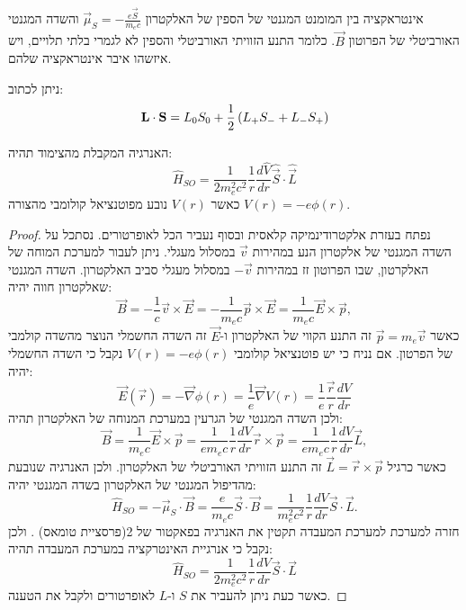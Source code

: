 \documentclass{tstextbook}
\begin{document}
\begin{definition}
אינטראקציה בין המומנט המגנטי של הספין של האלקטרון \(\vec{\mu}_{S}=-\frac{e\vec{S}}{m_{e}c}\) והשדה המגנטי האורביטלי של הפרוטון \(\vec{B}\). כלומר התנע הזוויתי האורביטלי והספין לא לגמרי בלתי תלויים, ויש איזשהו איבר אינטראקציה שלהם.

\end{definition}
\begin{lemma}
ניתן לכתוב:
$${\bf L}\cdot{\bf S}={ L}_{0}S_{0}+\frac{1}{2}\left({ L}_{+}S_{-}+{ L}_{-}S_{+}\right)$$

\end{lemma}
\begin{proposition}
האנרגיה המקבלת מהצימוד תהיה:
$$\hat{H}_{S O}=\frac{1}{2m_{e}^{2}c^{2}}\frac{1}{r}\frac{d\hat{V}}{d r}\hat{\vec{S}}\cdot\hat{\vec{L}}$$
כאשר \(V(r)\) נובע מפוטנציאל קולומבי מהצורה \(V(r)=-e\phi(r)\).

\end{proposition}
\begin{proof}
נפתח בעזרת אלקטרודינמיקה קלאסית ובסוף נעביר הכל לאופרטורים. נסתכל על השדה המגנטי של אלקטרון הנע במהירות \(\vec{v}\) במסלול מעגלי. ניתן לעבור למערכת המוחה של האלקרטון, שבו הפרוטון זז במהירות \(-\vec{v}\) במסלול מעגלי סביב האלקטרון. השדה המגנטי שאלקטרון חווה יהיה:
$$\vec{B}=-\frac{1}{c}\vec{v}\times\vec{E}=-\frac{1}{m_{e}c}\vec{p}\times\vec{E}=\frac{1}{m_{e}c}\vec{E}\times\vec{p},$$
כאשר \(\vec{p}=m_{e}\vec{v}\) זה התנע הקווי של האלקטרון ו-\(\vec{E}\) זה השדה החשמלי הנוצר מהשדה קולמבי של הפרטון. אם נניח כי יש פוטנציאל קולומבי \(V(r)=-e\phi(r)\) נקבל כי השדה החשמלי יהיה:
$$\vec{E}(\vec{r})=-\vec{\nabla}\phi(r)=\frac{1}{e}\vec{\nabla}V(r)=\frac{1}{e}\frac{\vec{r}}{r}\frac{d V}{d r}$$
ולכן השדה המגנטי של הגרעין במערכת המנוחה של האלקטרון תהיה:
$${\vec{B}}={\frac{1}{m_{e}c}}{\vec{E}}\times{\vec{p}}={\frac{1}{e m_{e}c}}{\frac{1}{r}}{\frac{d V}{d r}}{\vec{r}}\times{\vec{p}}={\frac{1}{e m_{e}c}}{\frac{1}{r}}{\frac{d V}{d r}}{\vec{L}},$$
כאשר כרגיל \(\vec{L}=\vec{r}\times \vec{p}\) זה התנע הזוויתי האורביטלי של האלקטרון. ולכן האנרגיה שנובעת מהדיפול המגנטי של האלקטרון בשדה המגנטי יהיה:
$${\hat{H}}_{S O}=-{\vec{\mu}}_{S}\cdot{\vec{B}}={\frac{e}{m_{e}c}}{\vec{S}}\cdot{\vec{B}}={\frac{1}{m_{e}^{2}c^{2}}}{\frac{1}{r}}{\frac{d V}{d r}}{\vec{S}}\cdot{\vec{L}}.$$
חזרה למערכת למערכת המעבדה תקטין את האנרגיה בפאקטור של 2(פרסציית טומאס) . ולכן נקבל כי אנרגיית האינטרקציה במערכת המעבדה תהיה:
$$\hat{H}_{S O}=\frac{1}{2m_{e}^{2}c^{2}}\frac{1}{r}\frac{d V}{d r}\vec{S}\cdot\vec{L}$$
כאשר כעת ניתן להעביר את \(S\) ו-\(L\) לאופרטורים ולקבל את הטענה.

\end{proof}
\end{document}
